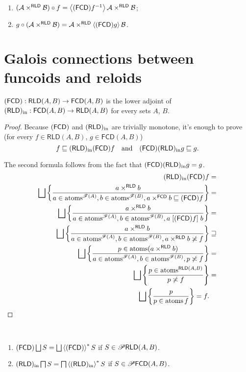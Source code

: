 \begin{cor}
~
\begin{enumerate}
\item $(\mathcal{A}\times^{\mathsf{RLD}}\mathcal{B})\circ f=\left\langle (\mathsf{FCD}) f^{-1}\right\rangle\mathcal{A}\times^{\mathsf{RLD}}\mathcal{B}$;
\item $g\circ(\mathcal{A}\times^{\mathsf{RLD}}\mathcal{B})=\mathcal{A}\times^{\mathsf{RLD}}\left\langle (\mathsf{FCD}) g\right\rangle\mathcal{B}$.
\end{enumerate}
\end{cor}

\section{Galois connections
between funcoids and reloids}
\begin{thm}
$(\mathsf{FCD}):\mathsf{RLD}(A,B)\rightarrow\mathsf{FCD}(A,B)$ is the lower
adjoint of $(\mathsf{RLD})_{\mathrm{in}}:\mathsf{FCD}(A,B)\rightarrow\mathsf{RLD}(A,B)$
for every sets $A$, $B$.\end{thm}
\begin{proof}
Because $(\mathsf{FCD})$ and $(\mathsf{RLD})_{\mathrm{in}}$ are trivially monotone, it's enough
to prove (for every $f\in\mathsf{RLD}(A,B)$, $g\in\mathsf{FCD}(A,B)$)
\[
f\sqsubseteq(\mathsf{RLD})_{\mathrm{in}}(\mathsf{FCD}) f\quad\text{and}\quad(\mathsf{FCD})(\mathsf{RLD})_{\mathrm{in}} g\sqsubseteq g.
\]


The second formula follows from the fact that $(\mathsf{FCD})(\mathsf{RLD})_{\mathrm{in}} g=g$.
\begin{align*}
\torldin\tofcd f & =\\
\bigsqcup\setcond{a\times^{\mathsf{RLD}}b}{a\in\atoms^{\mathscr{F}(A)},b\in\atoms^{\mathscr{F}(B)},a\times^{\mathsf{FCD}}b\sqsubseteq\tofcd f} & =\\
\bigsqcup\setcond{a\times^{\mathsf{RLD}}b}{a\in\atoms^{\mathscr{F}(A)},b\in\atoms^{\mathscr{F}(B)},a\suprel{\tofcd f}b} & =\\
\bigsqcup\setcond{a\times^{\mathsf{RLD}}b}{a\in\atoms^{\mathscr{F}(A)},b\in\atoms^{\mathscr{F}(B)},a\times^{\mathsf{RLD}}b\nasymp f} & \sqsupseteq\\
\bigsqcup\setcond{p\in\atoms(a\times^{\mathsf{RLD}}b)}{a\in\atoms^{\mathscr{F}(A)},b\in\atoms^{\mathscr{F}(B)},p\nasymp f} & =\\
\bigsqcup\setcond{p\in\atoms^{\mathsf{RLD}(A,B)}}{p\nasymp f} & =\\
\bigsqcup\setcond p{p\in\atoms f}=f.
\end{align*}
\end{proof}
\begin{cor}\label{rels-dist}
~
\begin{enumerate}
\item $\tofcd\bigsqcup S=\bigsqcup\rsupfun{\tofcd}S$ if $S\in\mathscr{P}\mathsf{RLD}(A,B)$.
\item $(\mathsf{RLD})_{\mathrm{in}}\bigsqcap S=\bigsqcap\left\langle (\mathsf{RLD})_{\mathrm{in}}\right\rangle ^{\ast}S$ if $S\in\mathscr{P}\mathsf{FCD}(A,B)$.
\end{enumerate}
\end{cor}

